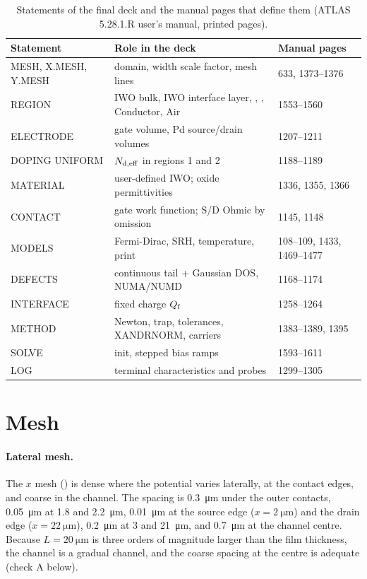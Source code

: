 \begin{table}[htbp]
\centering
\small
\caption{Statements of the final deck and the manual pages that define them (ATLAS 5.28.1.R user's manual, printed
pages).}
\label{tab:num-statements}
\begin{tabularx}{\linewidth}{@{}lXl@{}}
\toprule
Statement & Role in the deck & Manual pages \\
\midrule
MESH, X.MESH, Y.MESH & domain, width scale factor, mesh lines & 633, 1373--1376 \\
REGION & IWO bulk, IWO interface layer, \AlO{}, \HfO{}, Conductor, Air & 1553--1560 \\
ELECTRODE & gate volume, Pd source/drain volumes & 1207--1211 \\
DOPING UNIFORM & $N_{\mathrm{d,eff}}$ in regions 1 and 2 & 1188--1189 \\
MATERIAL & user-defined IWO; oxide permittivities & 1336, 1355, 1366 \\
CONTACT & gate work function; S/D Ohmic by omission & 1145, 1148 \\
MODELS & Fermi-Dirac, SRH, temperature, print & 108--109, 1433, 1469--1477 \\
DEFECTS & continuous tail + Gaussian DOS, NUMA/NUMD & 1168--1174 \\
INTERFACE & fixed charge $Q_{\mathrm{f}}$ & 1258--1264 \\
METHOD & Newton, trap, tolerances, XANDRNORM, carriers & 1383--1389, 1395 \\
SOLVE & init, stepped bias ramps & 1593--1611 \\
LOG & terminal characteristics and probes & 1299--1305 \\
\bottomrule
\end{tabularx}
\end{table}

\section{Mesh}\label{sec:num-mesh}

\paragraph{Lateral mesh.} The $x$ mesh () is dense where the potential varies laterally, at
the contact edges, and coarse in the channel. The spacing is \SI{0.3}{\micro\metre} under the outer contacts,
\SI{0.05}{\micro\metre} at 1.8 and \SI{2.2}{\micro\metre}, \SI{0.01}{\micro\metre} at the source edge
($x = \SI{2}{\micro\metre}$) and the drain edge ($x = \SI{22}{\micro\metre}$), \SI{0.2}{\micro\metre} at 3 and
\SI{21}{\micro\metre}, and \SI{0.7}{\micro\metre} at the channel centre. Because $L = \SI{20}{\micro\metre}$ is three
orders of magnitude larger than the film thickness, the channel is a gradual channel, and the coarse spacing at the
centre is adequate (check A below).

